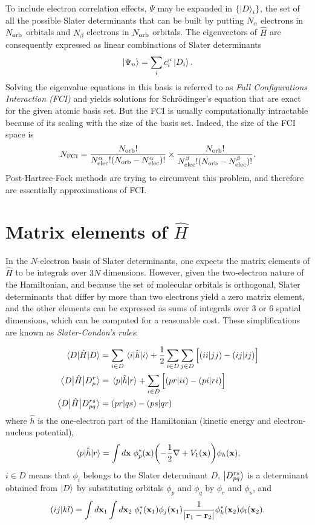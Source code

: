\documentclass[./thesis.tex]{subfiles}
\begin{document}
To include electron correlation effects, $\Psi$ may be expanded in
$\{\ket D_i \}$, the set of all the possible Slater determinants that can be built by putting $N_\alpha$ electrons in ${N_\text{orb}}$ orbitals and $N_\beta$ electrons in ${N_\text{orb}}$ orbitals.
The eigenvectors of $\widehat{H}$ are consequently expressed as linear combinations of Slater determinants 
\begin{equation}
\ket{\Psi_n} = \sum_{i} c_i^n \ket{D_i}.
\end{equation}
Solving the eigenvalue equations in this basis is referred to as \emph{Full Configurations Interaction (FCI)} and yields solutions for Schrödinger's equation that are exact for the given atomic basis set.
But the FCI is usually computationally intractable because of its scaling with the size of the basis set. Indeed, the size of the FCI space is
\begin{equation}
N_\text{FCI} = \frac{{N_\text{orb}}!}{{N_\text{elec}^\alpha} ! ({N_\text{orb}}-{N_\text{elec}^\alpha})!} \times \frac{{N_\text{orb}}!}{{N_\text{elec}^\beta} ! ({N_\text{orb}}-{N_\text{elec}^\beta})!}.
\end{equation}
Post-Hartree-Fock methods are trying to circumvent this problem, and therefore
are essentially approximations of FCI.

\section{Matrix elements of ${\widehat H}$}
\label{sec:meth_mel}

In the $N$-electron basis of Slater determinants, one expects the matrix elements of $\widehat H$ to be integrals over $3N$ dimensions.
However, given the two-electron nature of the Hamiltonian, and because the set of molecular orbitals is orthogonal, Slater determinants that differ by more than two electrons yield a zero matrix element, and the other elements can be expressed as sums of integrals over 3 or 6 spatial dimensions, which can be computed for a reasonable cost. These simplifications are known as \emph{Slater-Condon's rules}:

\begin{align}
\mel{D}{\hat{H}}{D} & = \sum_{i\in D} \mel{i}{\hat{h}}{i} + \frac{1}{2} \sum_{i\in D} \sum_{j\in D} \Big [ (ii|jj) - (ij|ij) \Big ]      \\
\mel{D}{\hat{H}}{D_p^r} & = \mel{p}{\hat{h}}{r} + \sum_{i\in D} \Big [ (pr|ii) - (pi|ri) \Big ]        \\
\mel{D}{\hat{H}}{D_{pq}^{rs}} & = (pr|qs) - (ps|qr)
\end{align}
where $\hat{h}$ is the one-electron part of the Hamiltonian (kinetic energy and
electron-nucleus potential),
\begin{equation}
\mel{p}{\hat{h}}{r} = \int d{\bf x}\; \phi^*_p(\mathbf{x}) \qty( -\frac{1}{2}\nabla + V_1(\mathbf{x})) \phi_h(\mathbf{x}),
\end{equation}
$i \in D$ means that $\phi_i$ belongs to the
Slater determinant $D$, $\ket {D_{pq}^{rs}}$ is a determinant obtained from $\ket
D$ by substituting orbitals $\phi_p$ and $\phi_q$ by $\phi_r$ and
$\phi_s$, and
\begin{equation}
(ij|kl) = \int d{\bf x}_1 \int d{\bf x}_2 \; \phi^*_i({\bf x}_1)\phi_j({\bf x}_1) \frac{1}{|{\bf r}_1 - {\bf r}_2|} \phi^*_k({\bf x}_2)\phi_l({\bf x}_2).
\end{equation}
\end{document}
